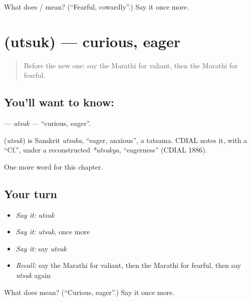 \begin{tcolorbox}[breakable,colback=teal!4,colframe=teal!35!black,title={Before you move on}]
What does  /  mean? (\textquotedblleft{}Fearful, cowardly\textquotedblright{}.) Say it once more.
\end{tcolorbox}
\section[\texorpdfstring{\mr{उत्सुक} (utsuk)}{उत्सुक (utsuk)}]{ (utsuk) — curious, eager}

\label{lesson:MR-C204-utsuk}



\begin{quote}
Before the new one: say the Marathi for valiant, then the Marathi for fearful.
\end{quote}

\subsection*{You'll want to know: }
\textbf{} — \emph{utsuk} — \textquotedblleft{}curious, eager\textquotedblright{}.

\begin{cousinweb}
\textbf{} (\emph{utsuk}) is Sanskrit \emph{utsuka}, \textquotedblleft{}eager, anxious\textquotedblright{}, a tatsama. CDIAL notes it, with a \textquotedblleft{}Cf.\textquotedblright{}, under a reconstructed \emph{*utsukya}, \textquotedblleft{}eagerness\textquotedblright{} (CDIAL 1886).
\end{cousinweb}

\begin{grammarlens}[title={What you've built}]
One more word for this chapter.
\end{grammarlens}

\subsection*{Your turn}
\begin{itemize}
\raggedright
  \item \emph{Say it:} \emph{utsuk}
  \item \emph{Say it:} \emph{utsuk}, once more
  \item \emph{Say it:} say \emph{utsuk}
  \item \emph{Recall:} say the Marathi for valiant, then the Marathi for fearful, then say \emph{utsuk} again
\end{itemize}

\begin{tcolorbox}[breakable,colback=teal!4,colframe=teal!35!black,title={Before you move on}]
What does  mean? (\textquotedblleft{}Curious, eager\textquotedblright{}.) Say it once more.
\end{tcolorbox}
